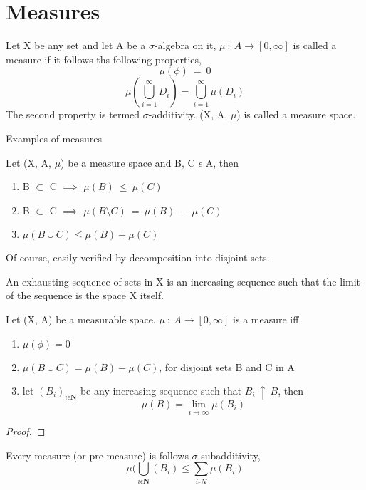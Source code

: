 \section{Measures}
\begin{definition}
    Let X be any set and let A be a $\sigma$-algebra on it, $\mu \: : \:
    A \rightarrow [0,\infty]$ is called a measure if it follows ths following
    properties,
    \[
        \mu(\phi) \: = \: 0
    \]
    \[
        \mu(\bigcup_{i=1}^{\infty} D_{i}) = \bigcup_{i=1}^{\infty}
        \mu(D_{i})
    \]
    The second property is termed $\sigma$-additivity.
    (X, A, $\mu$) is called a measure space.
\end{definition}
Examples of measures
\begin{lemma}
    Let (X, A, $\mu$) be a measure space and B, C $\epsilon$ A, then
    \begin{enumerate}
        \item B $\subset$ C $\implies$ $\mu(B) \: \leqslant \: \mu(C)$
        \item B $\subset$ C $\implies$ $\mu(B \setminus C) \: = \: \mu(B) \: - \:
            \mu(C)$
        \item $\mu(B \cup C) \leqslant \mu(B) + \mu(C)$
    \end{enumerate}
\end{lemma}
Of course, easily verified by decomposition into disjoint sets.
\begin{definition}
    An exhausting sequence of sets in X is an increasing sequence such that the
    limit of the sequence is the space X itself.
\end{definition}
\begin{theorem}
    Let (X, A) be a measurable space. $\mu \: : \: A \rightarrow [0,\infty]$ is
    a measure iff
    \begin{enumerate}
        \item $\mu(\phi) = 0$
        \item $\mu(B \cup C) = \mu(B) + \mu(C)$, for disjoint sets B and C in A
        \item let $(B_i)_{i \epsilon \bm{N}}$ be any increasing sequence such
            that $B_i \: \uparrow \: B$, then
            \[
                \mu(B) = \lim_{i \rightarrow \infty} \mu(B_i)
            \]
    \end{enumerate}
\end{theorem}
\begin{proof}
\end{proof}
\begin{theorem}
    Every measure (or pre-measure) is follows $\sigma$-subadditivity,
    \[
        \mu(\bigcup_{i \epsilon \bm{N}}(B_i) \leqslant \sum_{i \epsilon N}\mu(B_i)
    \]
\end{theorem}
